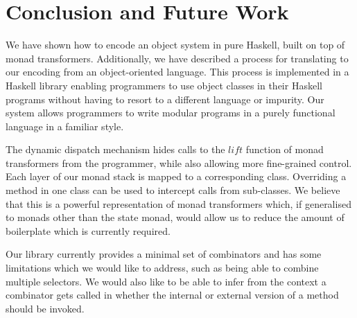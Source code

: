 \documentclass[authoryear,preprint]{sigplanconf}
\begin{document}


\section{Conclusion and Future Work}
\label{sec:conclusions}

We have shown how to encode an object system in pure Haskell, built on top of monad transformers. Additionally, we have described a process for translating to our encoding from an object-oriented language. This process is implemented in a Haskell library enabling programmers to use object classes in their Haskell programs without having to resort to a different language or impurity. Our system allows programmers to write modular programs in a purely functional language in a familiar style. 

The dynamic dispatch mechanism hides calls to the $\mathit{lift}$ function of monad transformers from the programmer, while also allowing more fine-grained control. Each layer of our monad stack is mapped to a corresponding class. Overriding a method in one class can be used to intercept calls from sub-classes. We believe that this is a powerful representation of monad transformers which, if generalised to monads other than the state monad, would allow us to reduce the amount of boilerplate which is currently required.

Our library currently provides a minimal set of combinators and has some limitations which we would like to address, such as being able to combine multiple selectors. We would also like to be able to infer from the context a combinator gets called in whether the internal or external version of a method should be invoked.
\end{document}
